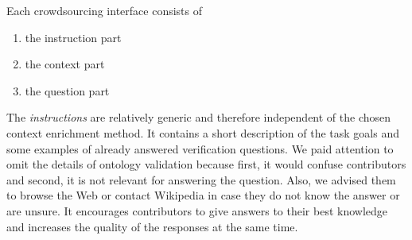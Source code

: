 Each crowdsourcing interface consists of
\begin{enumerate}
		\item the instruction part
		\item the context part
		\item the question part
\end{enumerate}

The \emph{instructions} are relatively generic and therefore independent of the chosen context enrichment method. It contains a short description of the task goals and some examples of already answered verification questions. We paid attention to omit the details of ontology validation because first, it would confuse contributors and second, it is not relevant for answering the question. Also, we advised them to browse the Web or contact Wikipedia in case they do not know the answer or are unsure. It encourages contributors to give answers to their best knowledge and increases the quality of the responses at the same time. 

